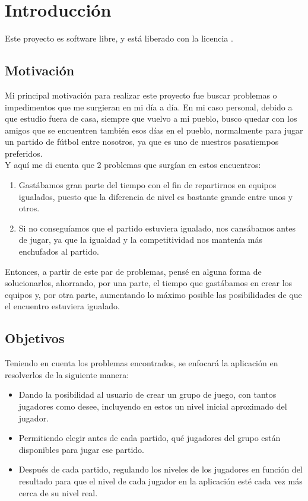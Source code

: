 \chapter{Introducción}

Este proyecto es software libre, y está liberado con la licencia \cite{gplv3}.

\section{Motivación}

Mi principal motivación para realizar este proyecto fue buscar problemas o impedimentos que me surgieran en mi día a día.
En mi caso personal, debido a que estudio fuera de casa, siempre que vuelvo a mi pueblo, busco quedar con los amigos que se encuentren también esos días en el pueblo, 
normalmente para jugar un partido de fútbol entre nosotros, ya que es uno de nuestros pasatiempos preferidos.\\

Y aquí me di cuenta que 2 problemas que surgían en estos encuentros:
\begin{enumerate}
    \item Gastábamos gran parte del tiempo con el fin de repartirnos en equipos igualados, puesto que la diferencia de nivel es bastante grande entre unos y otros.
    \item Si no conseguíamos que el partido estuviera igualado, nos cansábamos antes de jugar, ya que la igualdad y la competitividad nos mantenía más enchufados al partido.
\end{enumerate}

Entonces, a partir de este par de problemas, pensé en alguna forma de solucionarlos, ahorrando, por una parte, el tiempo que gastábamos en crear los equipos y, por otra parte,
aumentando lo máximo posible las posibilidades de que el encuentro estuviera igualado.

\newpage

\section{Objetivos}

Teniendo en cuenta los problemas encontrados, se enfocará la aplicación en resolverlos de la siguiente manera:
\begin{itemize}
    \item Dando la posibilidad al usuario de crear un grupo de juego, con tantos jugadores como desee, incluyendo en estos un nivel inicial aproximado del jugador.
    \item Permitiendo elegir antes de cada partido, qué jugadores del grupo están disponibles para jugar ese partido.
    \item Después de cada partido, regulando los niveles de los jugadores en función del resultado para que el nivel de cada jugador en la aplicación esté cada vez más cerca de su nivel real.
\end{itemize}